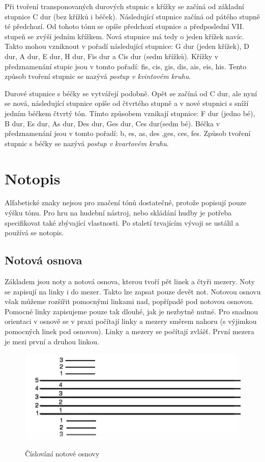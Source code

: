 Při tvoření transponovaných durových stupnic s křížky 
se začíná od základní stupnice C dur (bez křížků i béček).
Následující stupnice začíná od pátého stupně té předchozí.
Od tohoto tónu se opíše předchozí stupnice 
a předposlední VII. stupeň se zvýší jedním křížkem.
Nová stupnice má tedy o jeden křížek navíc.
Takto mohou vzniknout v pořadí následující stupnice: 
G dur (jeden křížek), D dur, A dur, E dur, H dur, Fis dur a Cis dur (sedm křížků).
Křížky v předznamenání stupic jsou v tomto pořadí:
fis, cis, gis, dis, ais, eis, his.
Tento způsob tvoření stupnic se nazývá \emph{postup v kvintovém kruhu}.
\cite{kofron}
\par
Durové stupnice s béčky se vytvářejí podobně.
Opět se začíná od C dur, ale nyní se nová, 
následující stupnice opíše od čtvrtého stupně
a v nové stupnici s sníží jedním béčkem čtvrtý tón.
Tímto způsobem vznikají stupnice:
F dur (jedno bé), B dur, Es dur, As dur, Des dur, Ges dur, Ces dur(sedm bé).
Béčka v předznamenání jsou v tomto pořadí:
b, es, as, des ,ges, ces, fes.
Způsob tvoření stupnic s béčky se nazývá \emph{postup v kvartovém kruhu}.
\cite{kofron}
\par




\section{Notopis}
Alfabetické znaky nejsou pro značení tónů dostatečné, protože popisují pouze výšku tónu.
Pro hru na hudební nástroj, nebo skládání hudby je potřeba specifikovat také zbývající vlastnosti.
Po staletí trvajícím vývoji se ustálil a používá se notopis.\par

\subsection*{Notová osnova}
Základem jsou noty a notová osnova, kterou tvoří pět linek a čtyři mezery.
Noty se zapisují na linky i do mezer.
Takto lze zapsat pouze devět not.
Notovou osnovu však můžeme rozšířit pomocnými linkami nad, popřípadě pod notovou osnovou. 
Pomocné linky zapisujeme pouze tak dlouhé, jak je nezbytně nutné.
Pro snadnou orientaci v osnově se v praxi počítají linky a mezery směrem nahoru (s výjimkou pomocných linek pod osnovou). 
Linky a mezery se počítají zvlášť. 
První mezera je mezi první a druhou linkou.\par

\begin{figure}[h]\centering
    \centering
    \includegraphics[width=0.5\linewidth]{obrazky/notovaOsnova.png}\\[1pt]  
    \caption{Číslování notové osnovy}    
    \label{obrazekNotovaOsnova}
\end{figure}


